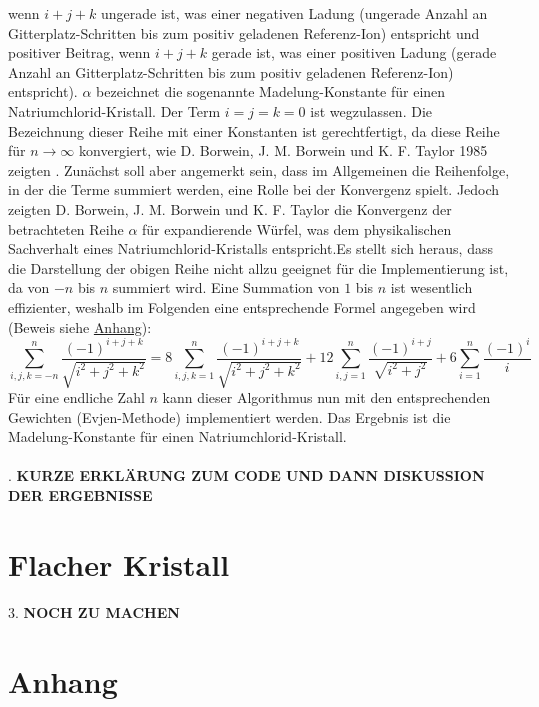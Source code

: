 \documentclass[11pt,a4paper]{article}
\begin{document}
wenn $i+j+k$ ungerade ist, was einer negativen Ladung (ungerade Anzahl an Gitterplatz-Schritten bis zum positiv geladenen Referenz-Ion) entspricht und positiver Beitrag, wenn $i+j+k$ gerade ist, was einer positiven Ladung (gerade Anzahl
an Gitterplatz-Schritten bis zum positiv geladenen Referenz-Ion) entspricht). $\alpha$ bezeichnet die sogenannte Madelung-Konstante für einen Natriumchlorid-Kristall. Der Term $i=j=k=0$ ist wegzulassen. Die Bezeichnung dieser Reihe mit einer Konstanten ist gerechtfertigt, da diese
Reihe für $n \to \infty$ konvergiert, wie D. Borwein, J. M. Borwein und K. F. Taylor 1985 zeigten \cite{key3}. Zunächst soll aber angemerkt sein, dass im Allgemeinen die Reihenfolge, in der die Terme summiert werden, eine Rolle bei der Konvergenz spielt. Jedoch zeigten
D. Borwein, J. M. Borwein und K. F. Taylor die Konvergenz der betrachteten Reihe $\alpha$ für expandierende Würfel, was dem physikalischen Sachverhalt eines Natriumchlorid-Kristalls entspricht.\newline Es stellt sich heraus, dass die Darstellung der obigen Reihe nicht allzu geeignet
für die Implementierung ist, da von $-n$ bis $n$ summiert wird. Eine Summation von $1$ bis $n$ ist wesentlich effizienter, weshalb im Folgenden eine entsprechende Formel angegeben wird (Beweis siehe \hyperref[sec:anhang]{Anhang}):
\begin{equation*}
    \sum_{i,j,k=-n}^{n}\frac{(-1)^{i+j+k}}{\sqrt{i^2 + j^2 + k^2}} = 8\sum_{i,j,k=1}^{n}\frac{(-1)^{i+j+k}}{\sqrt{i^2 + j^2 + k^2}} + 12\sum_{i,j=1}^{n}\frac{(-1)^{i+j}}{\sqrt{i^2 + j^2}} + 6\sum_{i=1}^{n} \frac{(-1)^{i}}{i}
\end{equation*}
Für eine endliche Zahl $n$ kann dieser Algorithmus nun mit den entsprechenden Gewichten (Evjen-Methode) implementiert werden. Das Ergebnis ist die Madelung-Konstante für einen Natriumchlorid-Kristall.\\ \\

. \textbf{KURZE ERKLÄRUNG ZUM CODE UND DANN DISKUSSION DER ERGEBNISSE}

\section*{Flacher Kristall}\label{sec:flach}

3. \textbf{NOCH ZU MACHEN}

\section*{Anhang}\label{sec:anhang}
\end{document}
